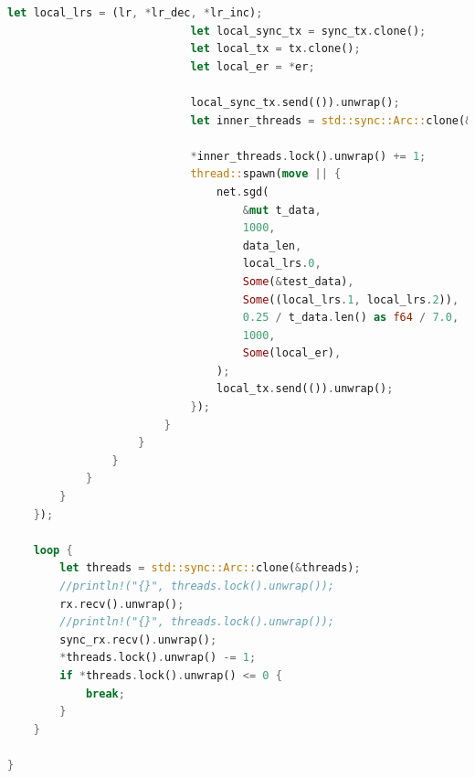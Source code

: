 \documentclass[12pt,twoside]{article}
\begin{document}
\begin{lstlisting}[language=Rust,caption=Przykładowy skrypt eksperymentalny,label={lst:mpsc}]
                            let local_lrs = (lr, *lr_dec, *lr_inc);
                            let local_sync_tx = sync_tx.clone();
                            let local_tx = tx.clone();
                            let local_er = *er;

                            local_sync_tx.send(()).unwrap();
                            let inner_threads = std::sync::Arc::clone(&tmp_threads);

                            *inner_threads.lock().unwrap() += 1;
                            thread::spawn(move || {
                                net.sgd(
                                    &mut t_data,
                                    1000,
                                    data_len,
                                    local_lrs.0,
                                    Some(&test_data),
                                    Some((local_lrs.1, local_lrs.2)),
                                    0.25 / t_data.len() as f64 / 7.0,
                                    1000,
                                    Some(local_er),
                                );
                                local_tx.send(()).unwrap();
                            });
                        }
                    }
                }
            }
        }
    });

    loop {
        let threads = std::sync::Arc::clone(&threads);
        //println!("{}", threads.lock().unwrap());
        rx.recv().unwrap();
        //println!("{}", threads.lock().unwrap());
        sync_rx.recv().unwrap();
        *threads.lock().unwrap() -= 1;
        if *threads.lock().unwrap() <= 0 {
            break;
        }
    }

}
\end{lstlisting}

\clearpage
\end{document}
